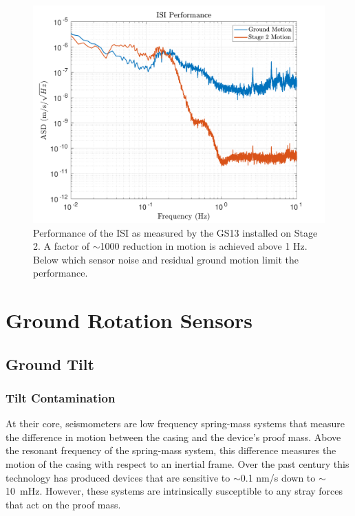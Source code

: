\documentclass [12pt, proquest]{uwthesis}[2019]
\begin{document}
\begin{figure}[!h]
\begin{center}
\includegraphics[width=\textwidth]{ISIPerf.pdf}
\caption[Performance of the ISI]{Performance of the ISI as measured by the GS13 installed on Stage 2. A factor of $\sim$1000 reduction in motion is achieved above 1 Hz. Below which sensor noise and residual ground motion limit the performance.}
\label{ISIPerf}
\end{center}
\end{figure}

\chapter{Ground Rotation Sensors} \label{BRS_chap}
\section{Ground Tilt}\label{tilt}
\subsection{Tilt Contamination}\label{tiltCon}
\quad At their core, seismometers are low frequency spring-mass systems that measure the difference in motion between the casing and the device's proof mass. Above the resonant frequency of the spring-mass system, this difference measures the motion of the casing with respect to an inertial frame. Over the past century this technology has produced devices that are sensitive to $\sim$0.1 nm/s down to $\sim$10~mHz. However, these systems are intrinsically susceptible to any stray forces that act on the proof mass.
\end{document}
